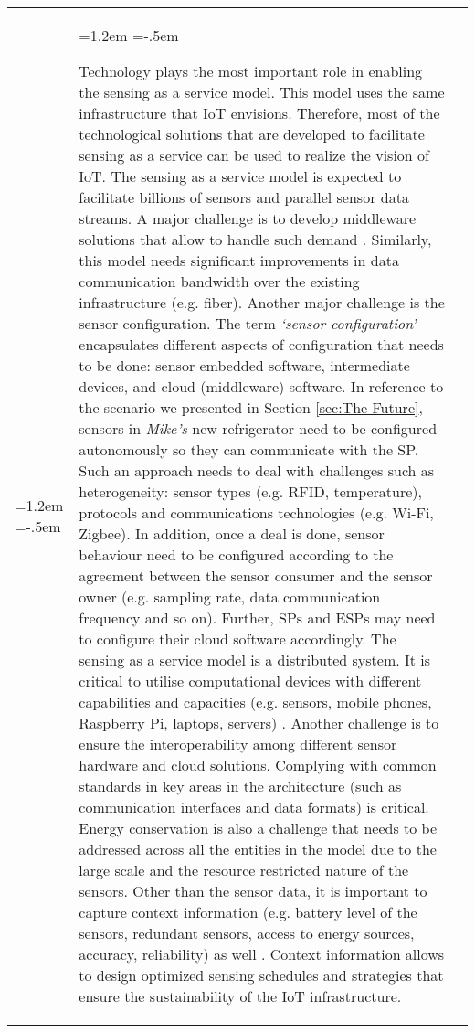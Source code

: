\documentclass[times]{ettauth}
\newenvironment{noindlist}
 {\begin{list}{\labelitemi}{\leftmargin=1.2em \itemindent=-.5em}}
 {\end{list}}
\begin{document}
\begin{table*}[t]
\begin{tabular}{ m{0.05cm} m{2.0cm} m{12cm}  }
\begin{noindlist}
    \end{noindlist}  
 &  \begin{noindlist}
  		 \item Technology plays the most important role in enabling the sensing as a service model. This model uses the same infrastructure that IoT envisions. Therefore, most of the technological solutions that are developed to facilitate sensing as a service can be used to realize the vision of IoT. The sensing as a service model is expected to facilitate billions of sensors and parallel sensor data streams. A major challenge is to develop middleware solutions that allow to handle such demand \cite{P377}. Similarly, this model needs significant improvements in data communication bandwidth \cite{P667} over the existing infrastructure (e.g. fiber). Another major challenge is the sensor configuration. The term \textit{`sensor configuration'} encapsulates different aspects of configuration that needs to be done: sensor embedded software, intermediate devices, and  cloud (middleware) software. In reference to the scenario we presented in Section \ref{sec:The Future}, sensors in \textit{Mike's} new refrigerator need to be configured autonomously so they can communicate with the SP. Such an approach needs to deal with challenges such as heterogeneity: sensor types (e.g. RFID, temperature), protocols and communications technologies (e.g. Wi-Fi, Zigbee). In addition, once a deal is done, sensor behaviour need to be configured according to the agreement between the sensor consumer and the sensor owner (e.g. sampling rate, data communication frequency and so on). Further, SPs and ESPs may need to configure their cloud software accordingly. The sensing as a service model is a distributed system. It is critical to utilise computational devices with different capabilities and capacities (e.g. sensors, mobile phones, Raspberry Pi, laptops, servers) \cite{ZMP005}. Another challenge is to ensure the interoperability among different sensor hardware and cloud solutions. Complying with common standards in key areas in the architecture (such as communication interfaces and data formats) is critical. Energy conservation is also a challenge that needs to be addressed across all the entities in the model due to the large scale and the resource restricted nature of the sensors. Other than the sensor data, it is important to capture context information (e.g. battery level of the sensors, redundant sensors, access to energy sources, accuracy, reliability) as well  \cite{ZMP007}. Context information allows to design optimized sensing schedules and strategies that ensure the sustainability of the IoT infrastructure.
  		 

\end{noindlist}
\end{tabular}
\end{table*}
\end{document}
